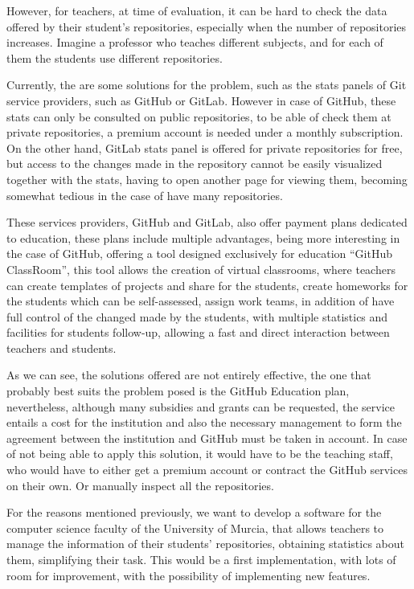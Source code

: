 However, for teachers, at time of evaluation, it can be hard to check the
data offered by their student’s repositories, especially when the number of
repositories increases. Imagine a professor who teaches different subjects,
and for each of them the students use different repositories.

Currently, the are some solutions for the problem, such as the stats panels
of Git service providers, such as GitHub or GitLab. However in case of
GitHub, these stats can only be consulted on public repositories, to be
able of check them at private repositories, a premium account is needed
under a monthly subscription. On the other hand, GitLab stats panel is
offered for private repositories for free, but access to the changes made
in the repository cannot be easily visualized together with the stats,
having to open another page for viewing them, becoming somewhat tedious in
the case of have many repositories.

These services providers, GitHub and GitLab, also offer payment plans
dedicated to education, these plans include multiple advantages, being more
interesting in the case of GitHub, offering a tool designed exclusively for
education “GitHub ClassRoom”, this tool allows the creation of virtual
classrooms, where teachers can create templates of projects and share for
the students, create homeworks for the students which can be self-assessed,
assign work teams, in addition of have full control of the changed made by
the students, with multiple statistics and facilities for students
follow-up, allowing a fast and direct interaction between teachers and
students.

As we can see, the solutions offered are not entirely effective, the one
that probably best suits the problem posed is the GitHub Education plan,
nevertheless, although many subsidies and grants can be requested, the
service entails a cost for the institution and also the necessary
management to form the agreement between the institution and GitHub must be
taken in account. In case of not being able to apply this solution, it
would have to be the teaching staff, who would have to either get a premium
account or contract the GitHub services on their own. Or manually inspect
all the repositories.

For the reasons mentioned previously, we want to develop a software for the
computer science faculty of the University of Murcia, that allows teachers
to manage the information of their students' repositories, obtaining
statistics about them, simplifying their task. This would be a first
implementation, with lots of room for improvement, with the possibility of
implementing new features.

